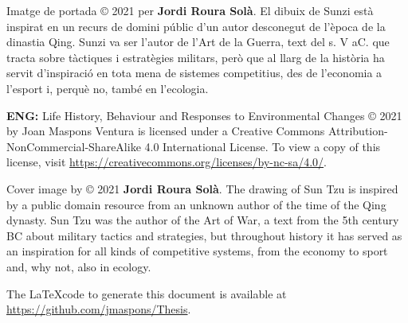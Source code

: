 \documentclass[12pt,a4paper,twoside,fleqn]{memoir}
\begin{document}
Imatge de portada © 2021 per \textbf{Jordi Roura Solà}. El dibuix de Sunzi està
inspirat en un recurs de domini públic d'un autor desconegut de l'època de la
dinastia Qing. Sunzi va ser l'autor de l'Art de la Guerra, text del s. V aC.
que tracta sobre tàctiques i estratègies militars, però que al llarg de la
història ha servit d'inspiració en tota mena de sistemes competitius, des de
l'economia a l'esport i, perquè no, també en l'ecologia.

\medskip


\textbf{ENG:} Life History, Behaviour and Responses to Environmental Changes
© 2021 by Joan Maspons Ventura is licensed under a Creative Commons
Attribution-NonCommercial-ShareAlike 4.0 International License. To view a copy
of this license, visit \url{https://creativecommons.org/licenses/by-nc-sa/4.0/}.

Cover image by © 2021 \textbf{Jordi Roura Solà}. The drawing of Sun Tzu is
inspired by a public domain resource from an unknown author of the time of the
Qing dynasty. Sun Tzu was the author of the Art of War, a text from the 5th
century BC about military tactics and strategies, but throughout history it has
served as an inspiration for all kinds of competitive systems, from the economy
to sport and, why not, also in ecology.

\bigskip

The \LaTeX code to generate this document is available at
\url{https://github.com/jmaspons/Thesis}.


\cleardoublepage %



\tableofcontents* %

\clearpage


\listoffigures %
\end{document}
